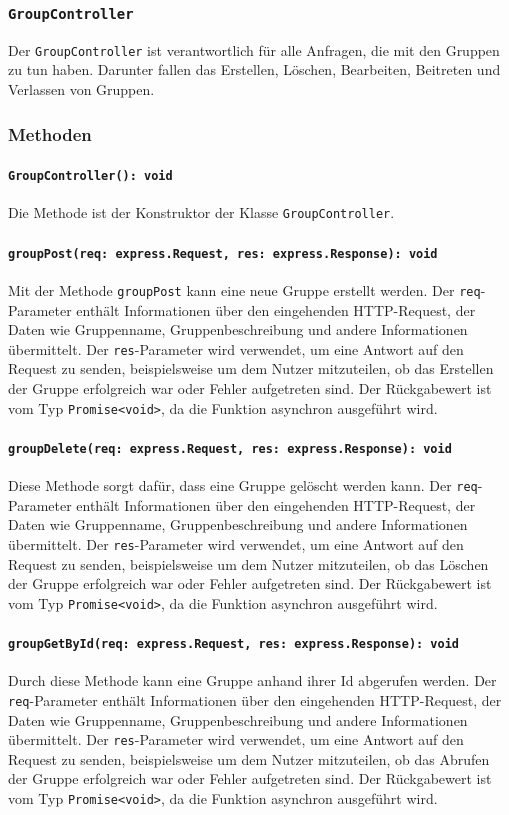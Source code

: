 \documentclass{entwurfsheft}
\begin{document}
\subsubsection{\texttt{GroupController}}\label{sec:GroupController}
Der \texttt{GroupController} ist verantwortlich für alle Anfragen, die mit den Gruppen zu tun haben. Darunter fallen das Erstellen, Löschen, Bearbeiten, Beitreten und Verlassen von Gruppen.
\subsubsection*{Methoden}
\paragraph{\texttt{GroupController(): void}}
Die Methode ist der Konstruktor der Klasse \texttt{GroupController}.
\paragraph{\texttt{groupPost(req: express.Request, res: express.Response): void}}
Mit der Methode \texttt{groupPost} kann eine neue Gruppe erstellt werden. Der \texttt{req}-Parameter enthält Informationen über den eingehenden HTTP-Request, der Daten wie Gruppenname, Gruppenbeschreibung und andere Informationen übermittelt. Der \texttt{res}-Parameter wird verwendet, um eine Antwort auf den Request zu senden, beispielsweise um dem Nutzer mitzuteilen, ob das Erstellen der Gruppe erfolgreich war oder Fehler aufgetreten sind.
Der Rückgabewert ist vom Typ \texttt{Promise<void>}, da die Funktion asynchron ausgeführt wird.
\paragraph{\texttt{groupDelete(req: express.Request, res: express.Response): void}}
Diese Methode sorgt dafür, dass eine Gruppe gelöscht werden kann. Der \texttt{req}-Parameter enthält Informationen über den eingehenden HTTP-Request, der Daten wie Gruppenname, Gruppenbeschreibung und andere Informationen übermittelt. Der \texttt{res}-Parameter wird verwendet, um eine Antwort auf den Request zu senden, beispielsweise um dem Nutzer mitzuteilen, ob das Löschen der Gruppe erfolgreich war oder Fehler aufgetreten sind.
Der Rückgabewert ist vom Typ \texttt{Promise<void>}, da die Funktion asynchron ausgeführt wird.
\paragraph{\texttt{groupGetById(req: express.Request, res: express.Response): void}}
Durch diese Methode kann eine Gruppe anhand ihrer Id abgerufen werden. Der \texttt{req}-Parameter enthält Informationen über den eingehenden HTTP-Request, der Daten wie Gruppenname, Gruppenbeschreibung und andere Informationen übermittelt. Der \texttt{res}-Parameter wird verwendet, um eine Antwort auf den Request zu senden, beispielsweise um dem Nutzer mitzuteilen, ob das Abrufen der Gruppe erfolgreich war oder Fehler aufgetreten sind.
Der Rückgabewert ist vom Typ \texttt{Promise<void>}, da die Funktion asynchron ausgeführt wird.
\end{document}
